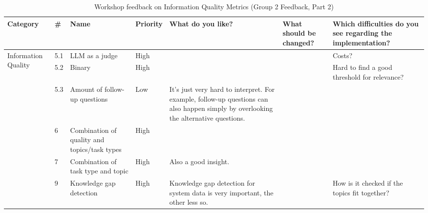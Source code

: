 \documentclass[
	english,
	ruledheaders=section,%
	class=report,%
	thesis={type=bachelor},%
	accentcolor=1b,%
	custommargins=true,%
	marginpar=false,%
	parskip=half-,%
	fontsize=11pt,%
	DIV=14,
]{tudapub}
\begin{document}
\begin{table}
    \centering
    \small 
    \caption{Workshop feedback on Information Quality Metrics (Group 2 Feedback, Part 2)}
    \label{tab:info_quality_g2_p2}
    \begin{tabularx}{\textheight}{p{2.2cm} l >{\RaggedRight\arraybackslash}X l >{\RaggedRight\arraybackslash}X >{\RaggedRight\arraybackslash}X >{\RaggedRight\arraybackslash}X}
        \toprule
        \textbf{Category} & \textbf{\#} & \textbf{Name} & \textbf{Priority} & \textbf{What do you like?} & \textbf{What should be changed?} & \textbf{Which difficulties do you see regarding the implementation?} \\
        \midrule

        \multirow{6}{=}{Information Quality} 
        & 5.1 & LLM as a judge & High & & & Costs? \\
        \cmidrule(l){2-7}
        & 5.2 & Binary & High & & & Hard to find a good threshold for relevance? \\
        \cmidrule(l){2-7}
        & 5.3 & Amount of follow-up questions & Low & It's just very hard to interpret. For example, follow-up questions can also happen simply by overlooking the alternative questions. & & \\
        \cmidrule(l){2-7}
        & 6 & Combination of quality and topics/task types & High & & & \\
        \cmidrule(l){2-7}
        & 7 & Combination of task type and topic & High & Also a good insight. & & \\
        \cmidrule(l){2-7}
        & 9 & Knowledge gap detection & High & Knowledge gap detection for system data is very important, the other less so. & & How is it checked if the topics fit together? \\
        \bottomrule
    \end{tabularx}
\end{table}
\end{document}
